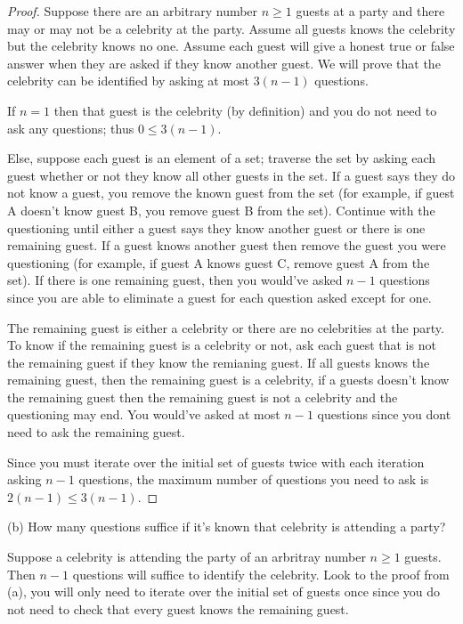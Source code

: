 \documentclass{article}
\begin{document}
    \begin{proof}
        Suppose there are an arbitrary number $n\geq 1$ guests at a party and there may or may not be a celebrity at the party. Assume all guests knows the celebrity but the celebrity knows no one. Assume each guest will give a honest true or false answer when they are asked if they know another guest. We will prove that the celebrity can be identified by asking at most $3(n-1)$ questions.
        
        If $n=1$ then that guest is the celebrity (by definition) and you do not need to ask any questions; thus $0\leq 3(n-1)$.
        
        Else, suppose each guest is an element of a set; traverse the set by asking each guest whether or not they know all other guests in the set. If a guest says they do not know a guest, you remove the known guest from the set (for example, if guest A doesn't know guest B, you remove guest B from the set). Continue with the questioning until either a guest says they know another guest or there is one remaining guest. If a guest knows another guest then remove the guest you were questioning (for example, if guest A knows guest C, remove guest A from the set). If there is one remaining guest, then you would've asked $n-1$ questions since you are able to eliminate a guest for each question asked except for one. 

        The remaining guest is either a celebrity or there are no celebrities at the party. To know if the remaining guest is a celebrity or not, ask each guest that is not the remaining guest if they know the remianing guest. If all guests knows the remaining guest, then the remaining guest is a celebrity, if a guests doesn't know the remaining guest then the remaining guest is not a celebrity and the questioning may end. You would've asked at most $n-1$ questions since you dont need to ask the remaining guest.

        Since you must iterate over the initial set of guests twice with each iteration asking $n-1$ questions, the maximum number of questions you need to ask is $2(n-1)\leq 3(n-1)$.
    \end{proof}

    (b) How many questions suffice if it's known that celebrity is attending a party?

    Suppose a celebrity is attending the party of an arbritray number $n\geq 1$ guests. Then $n-1$ questions will suffice to identify the celebrity. Look to the proof from (a), you will only need to iterate over the initial set of guests once since you do not need to check that every guest knows the remaining guest.
\end{document}
